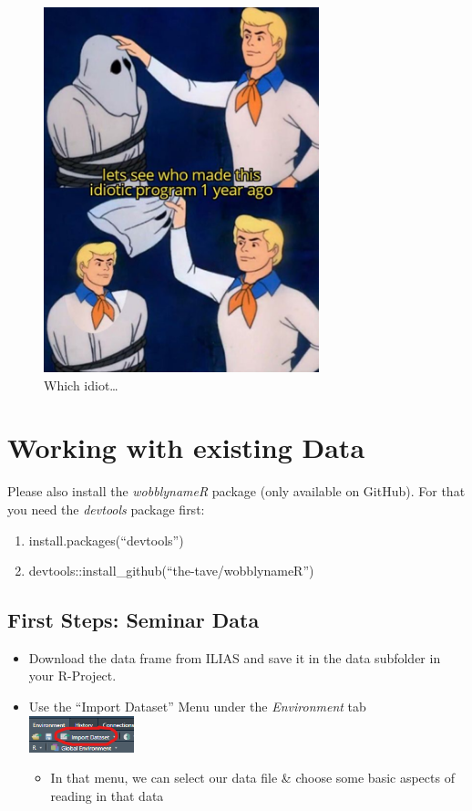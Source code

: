 \documentclass[
]{book}
\providecommand{\tightlist}{%
  \setlength{\itemsep}{0pt}\setlength{\parskip}{0pt}}
\begin{document}
\begin{figure}
\centering
\includegraphics[width=\textwidth,height=4.16667in]{./img/idiotic.png}
\caption{Which idiot\ldots{}}\label{id}
\end{figure}

\chapter{Working with existing Data}\label{working-with-existing-data}

Please also install the \emph{wobblynameR} package (only available on GitHub). For that you need the \emph{devtools} package first:

\begin{enumerate}
\def\labelenumi{\arabic{enumi}.}
\tightlist
\item
  install.packages(``devtools'')
\item
  devtools::install\_github(``the-tave/wobblynameR'')
\end{enumerate}

\section{First Steps: Seminar Data}\label{first-steps-seminar-data}

\begin{itemize}
\tightlist
\item
  Download the data frame from ILIAS and save it in the data subfolder in your R-Project.
\item
  Use the ``Import Dataset'' Menu under the \emph{Environment} tab \includegraphics[width=\textwidth,height=0.41667in]{./img/import_dataset.png}

  \begin{itemize}
  \tightlist
  \item
    In that menu, we can select our data file \& choose some basic aspects of reading in that data
  \end{itemize}
\end{itemize}
\end{document}
